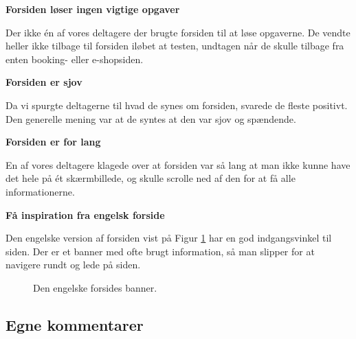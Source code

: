 \documentclass[10pt,a4paper]{article}      %
\newcommand\pic[1]{\texttt{[image: Pics/\#1]}}
\renewcommand\good{\pic{good}}
\renewcommand\goodidea{\pic{goodidea}}
\renewcommand\smallproblem{\pic{smallproblem}}
\renewcommand\seriousproblem{\pic{seriousproblem}}
\begin{document}
\begin{kommentarer}
\item[\seriousproblem]{\textbf{Forsiden løser ingen vigtige opgaver}}

Der ikke én af vores deltagere der brugte forsiden til at løse opgaverne. De
vendte heller ikke tilbage til forsiden iløbet at testen, undtagen når de skulle
tilbage fra enten booking- eller e-shopsiden.

\item[\good]{\textbf{Forsiden er sjov}}

Da vi spurgte deltagerne til hvad de synes om forsiden, svarede de fleste
positivt. Den generelle mening var at de syntes at den var sjov og spændende.

\item[\smallproblem]{\textbf{Forsiden er for lang}}

En af vores deltagere klagede over at forsiden var så lang at man ikke kunne
have det hele på ét skærmbillede, og skulle scrolle ned af den for at få alle
informationerne.

\item[\goodidea]{\textbf{Få inspiration fra engelsk forside}}

Den engelske version af forsiden vist på Figur \ref{fig:engelskbanner} har en
god indgangsvinkel til siden. Der er et banner med ofte brugt information, så
man slipper for at navigere rundt og lede på siden.
\end{kommentarer}


\begin{figure}[htbp]
    \centering
    \caption{Den engelske forsides banner.}
    \label{fig:engelskbanner}
\end{figure}


\subsection{Egne kommentarer} %
\label{sub:Egne kommentarer forsiden}
\end{document}
